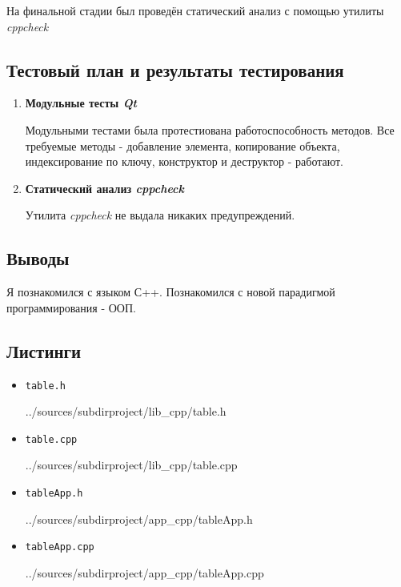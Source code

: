 \documentclass[12pt,a4paper]{report}
\begin{document}
На финальной стадии был проведён статический анализ с помощью утилиты \textit{cppcheck}%
\subsection{Тестовый план и результаты тестирования}
\hspace{\parindent}
\begin{enumerate}
\item \textbf{Модульные тесты \textit{Qt}}

Модульными тестами была протестиована работоспособность методов. Все требуемые методы - добавление элемента, копирование объекта, индексирование по ключу, конструктор и деструктор - работают.
\item \textbf{Статический анализ \textit{cppcheck}}

Утилита \textit{cppcheck} не выдала никаких предупреждений.
\end{enumerate}
\subsection{Выводы}
\hspace{\parindent}
Я познакомился с языком С++. Познакомился с новой парадигмой программирования - ООП.
\subsection*{Листинги}
\begin{itemize}
\item[] \verb-table.h-

{../sources/subdirproject/lib_cpp/table.h}

\item[] \verb-table.cpp-

{../sources/subdirproject/lib_cpp/table.cpp}

\item[] \verb-tableApp.h-

{../sources/subdirproject/app_cpp/tableApp.h}

\item[] \verb-tableApp.cpp-

{../sources/subdirproject/app_cpp/tableApp.cpp}
\end{itemize}

%
\end{document}
